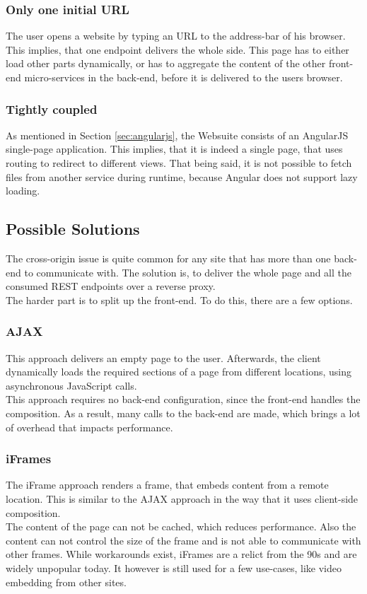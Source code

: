 \subsubsection{Only one initial URL}
The user opens a website by typing an URL to the address-bar of his browser. This implies, that one endpoint delivers the whole side. This page has to either load other parts dynamically, or has to aggregate the content of the other front-end micro-services in the back-end, before it is delivered to the users browser.

\subsubsection{Tightly coupled}
As mentioned in Section \ref{sec:angularjs}, the Websuite consists of an AngularJS single-page application. This implies, that it is indeed a single page, that uses routing to redirect to different views. That being said, it is not possible to fetch files from another service during runtime, because Angular does not support lazy loading.

\subsection{Possible Solutions}
The cross-origin issue is quite common for any site that has more than one back-end to communicate with. The solution is, to deliver the whole page and all the consumed REST endpoints over a reverse proxy.\\
The harder part is to split up the front-end. To do this, there are a few options.

\subsubsection{AJAX}
This approach delivers an empty page to the user. Afterwards, the client dynamically loads the required sections of a page from different locations, using asynchronous JavaScript calls.\\
This approach requires no back-end configuration, since the front-end handles the composition. As a result, many calls to the back-end are made, which brings a lot of overhead that impacts performance.

\subsubsection{iFrames}
The iFrame approach renders a frame, that embeds content from a remote location. This is similar to the AJAX approach in the way that it uses client-side composition.\\
The content of the page can not be cached, which reduces performance. Also the content can not control the size of the frame and is not able to communicate with other frames. While workarounds exist, iFrames are a relict from the 90s and are widely unpopular today. It however is still used for a few use-cases, like video embedding from other sites.

